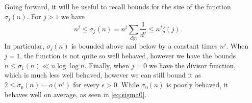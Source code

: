 \documentclass{article}
\theoremstyle{plain}
\theoremstyle{definition}
\begin{document}
Going forward, it will be useful to recall bounds for the size of the function $\sigma_j(n)$. For $j>1$ we have \[n^j \leq \sigma_j(n) = n^j \sum_{d|n} \frac{1}{d^j} \leq n^j \zeta(j).\]  In particular, $\sigma_j(n)$ is bounded above and below by a constant times $n^j$.  When $j=1$, the function is not quite so well behaved, however we have the bounds $n \leq \sigma_1(n) \ll n \log \log n.$ Finally, when $j=0$ we have the divisor function, which is much less well behaved, however we can still bound it as $2 \leq \sigma_0(n) = o(n^\epsilon)$ for every $\epsilon>0$.  While $\sigma_0(n)$ is poorly behaved, it behaves well on average, as seen in \eqref{eq:sigma0}.





\end{document}

